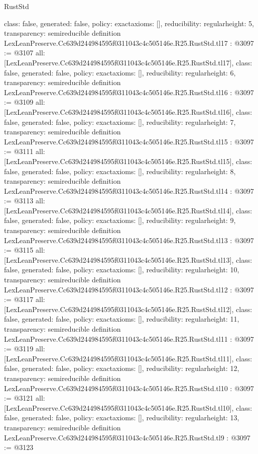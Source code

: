 \begin{lexlean}{RustStd}
\begin{coremodule}
{  class: false,
  generated: false,
  policy: exact{axioms: []},
  reducibility: regular{height: 5},
  transparency: semireducible
}
definition LexLeanPreserve.Cc639d244984595f0311043c4c505146e.R25.RustStd.tl17 : @3097 := @3107 {
  all: [LexLeanPreserve.Cc639d244984595f0311043c4c505146e.R25.RustStd.tl17],
  class: false,
  generated: false,
  policy: exact{axioms: []},
  reducibility: regular{height: 6},
  transparency: semireducible
}
definition LexLeanPreserve.Cc639d244984595f0311043c4c505146e.R25.RustStd.tl16 : @3097 := @3109 {
  all: [LexLeanPreserve.Cc639d244984595f0311043c4c505146e.R25.RustStd.tl16],
  class: false,
  generated: false,
  policy: exact{axioms: []},
  reducibility: regular{height: 7},
  transparency: semireducible
}
definition LexLeanPreserve.Cc639d244984595f0311043c4c505146e.R25.RustStd.tl15 : @3097 := @3111 {
  all: [LexLeanPreserve.Cc639d244984595f0311043c4c505146e.R25.RustStd.tl15],
  class: false,
  generated: false,
  policy: exact{axioms: []},
  reducibility: regular{height: 8},
  transparency: semireducible
}
definition LexLeanPreserve.Cc639d244984595f0311043c4c505146e.R25.RustStd.tl14 : @3097 := @3113 {
  all: [LexLeanPreserve.Cc639d244984595f0311043c4c505146e.R25.RustStd.tl14],
  class: false,
  generated: false,
  policy: exact{axioms: []},
  reducibility: regular{height: 9},
  transparency: semireducible
}
definition LexLeanPreserve.Cc639d244984595f0311043c4c505146e.R25.RustStd.tl13 : @3097 := @3115 {
  all: [LexLeanPreserve.Cc639d244984595f0311043c4c505146e.R25.RustStd.tl13],
  class: false,
  generated: false,
  policy: exact{axioms: []},
  reducibility: regular{height: 10},
  transparency: semireducible
}
definition LexLeanPreserve.Cc639d244984595f0311043c4c505146e.R25.RustStd.tl12 : @3097 := @3117 {
  all: [LexLeanPreserve.Cc639d244984595f0311043c4c505146e.R25.RustStd.tl12],
  class: false,
  generated: false,
  policy: exact{axioms: []},
  reducibility: regular{height: 11},
  transparency: semireducible
}
definition LexLeanPreserve.Cc639d244984595f0311043c4c505146e.R25.RustStd.tl11 : @3097 := @3119 {
  all: [LexLeanPreserve.Cc639d244984595f0311043c4c505146e.R25.RustStd.tl11],
  class: false,
  generated: false,
  policy: exact{axioms: []},
  reducibility: regular{height: 12},
  transparency: semireducible
}
definition LexLeanPreserve.Cc639d244984595f0311043c4c505146e.R25.RustStd.tl10 : @3097 := @3121 {
  all: [LexLeanPreserve.Cc639d244984595f0311043c4c505146e.R25.RustStd.tl10],
  class: false,
  generated: false,
  policy: exact{axioms: []},
  reducibility: regular{height: 13},
  transparency: semireducible
}
definition LexLeanPreserve.Cc639d244984595f0311043c4c505146e.R25.RustStd.tl9 : @3097 := @3123 {
}
\end{coremodule}
\end{lexlean}
